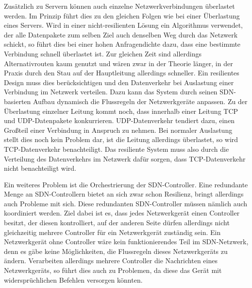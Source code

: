 Zusätzlich zu Servern können auch einzelne Netzwerkverbindungen überlastet werden. Im Prinzip führt dies zu den gleichen Folgen wie bei einer Überlastung eines Servers. 
Wird in einer nicht-resilienten Lösung ein Algorithmus verwendet, der alle Datenpakete zum selben Ziel auch denselben Weg durch das Netzwerk schickt, so führt dies bei einer hohen Anfragendichte dazu, 
dass eine bestimmte Verbindung schnell überlastet ist. Zur gleichen Zeit sind allerdings Alternativrouten kaum genutzt und wären zwar in der Theorie länger, 
in der Praxis durch den Stau auf der Hauptleitung allerdings schneller. Ein resilientes Design muss dies berücksichtigen und den Datenverkehr bei Auslastung einer Verbindung im Netzwerk verteilen. 
Dazu kann das System durch seinen \ac{SDN}-basierten Aufbau dynamisch die Flussregeln der Netzwerkgeräte anpassen. Zu der Überlastung einzelner Leitung kommt noch, dass innerhalb einer Leitung \ac{TCP} und \ac{UDP}-Datenpakete konkurrieren. 
\ac{UDP}-Datenverkehr tendiert dazu, einen Großteil einer Verbindung in Anspruch zu nehmen. Bei normaler Auslastung stellt dies noch kein Problem dar, ist die Leitung allerdings überlastet, so wird \ac{TCP}-Datenverkehr benachteiligt. 
Das resiliente System muss also durch die Verteilung des Datenverkehrs im Netzwerk dafür sorgen, dass \ac{TCP}-Datenverkehr nicht benachteiligt wird.

Ein weiteres Problem ist die Orchestrierung der \ac{SDN}-Controller. Eine redundante Menge an \ac{SDN}-Controllern bietet an sich zwar schon Resilienz, bringt allerdings auch Probleme mit sich. 
Diese redundanten \ac{SDN}-Controller müssen nämlich auch koordiniert werden. Ziel dabei ist es, dass jedes Netzwerkgerät einen Controller besitzt, der diesen kontrolliert, 
auf der anderen Seite dürfen allerdings nicht gleichzeitig mehrere Controller für ein Netzwerkgerät zuständig sein. Ein Netzwerkgerät ohne Controller wäre kein funktionierendes Teil im \ac{SDN}-Netzwerk, 
denn es gäbe keine Möglichkeiten, die Flussregeln dieses Netzwerkgeräts zu ändern. Verarbeiten allerdings mehrere Controller die Nachrichten eines Netzwerkgeräts, so führt dies auch zu Problemen, 
da diese das Gerät mit widersprüchlichen Befehlen versorgen könnten.%




